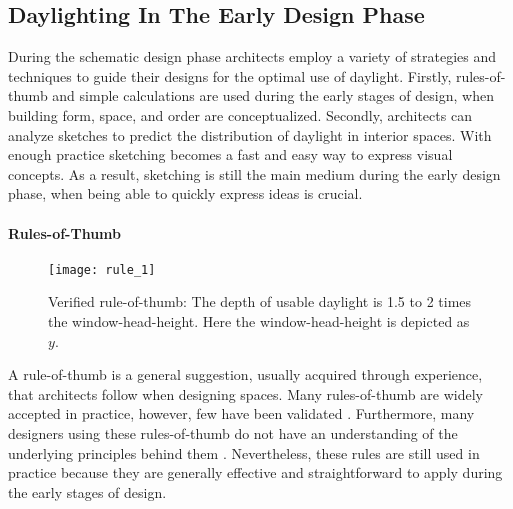 \subsection{Daylighting In The Early Design Phase}
During the schematic design phase architects employ a variety of strategies and techniques to guide their designs for the optimal use of daylight.
Firstly, rules-of-thumb and simple calculations are used during the early stages of design, when building form, space, and order are conceptualized.
Secondly, architects can analyze sketches to predict the distribution of daylight in interior spaces.
With enough practice sketching becomes a fast and easy way to express visual concepts.
As a result, sketching is still the main medium during the early design phase, when being able to quickly express ideas is crucial.  \\

\paragraph{Rules-of-Thumb}

\begin{figure}[h]
\centering
\texttt{[image: rule\_1]}
\caption[Example of a common rule-of-thumb for daylighting.]{Verified rule-of-thumb: The depth of usable daylight is 1.5 to 2 times the window-head-height. Here the window-head-height is depicted as $y$.}
\label{fig:daylightzone}
\end{figure}

A rule-of-thumb is a general suggestion, usually acquired through experience, that architects follow when designing spaces.  Many rules-of-thumb are widely accepted in practice, however, few have been validated \cite{reinhart2005simulation}.  Furthermore, many designers using these rules-of-thumb do not have an understanding of the underlying principles behind them \cite{Galasiu}. Nevertheless, these rules are still used in practice because they are generally effective and straightforward to apply during the early stages of design.  \\


